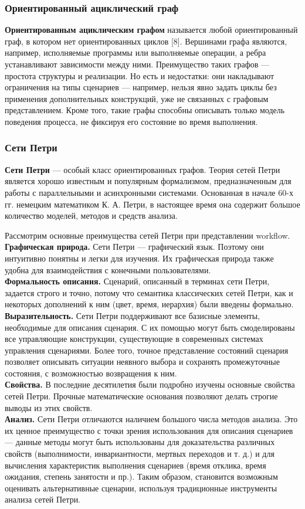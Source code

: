 \documentclass[a4paper,12pt]{article}
\begin{document}
\subsubsection{Ориентированный ациклический граф}
\textbf{Ориентированным ациклическим графом} называется любой ориентированный граф, в котором нет ориентированных циклов [8]. Вершинами графа являются, например, исполняемые программы или выполняемые операции, а ребра устанавливают зависимости между ними.
Преимущество таких графов — простота структуры и реализации. Но есть
и недостатки: они накладывают ограничения на типы сценариев — например, нельзя явно задать циклы без применения дополнительных конструкций, уже не связанных с графовым представлением. Кроме того, такие графы способны описывать только модель поведения процесса, не фиксируя его состояние во время выполнения.


\subsubsection{Сети Петри}
\textbf{Сети Петри}  — особый класс ориентированных графов. Теория сетей Петри является хорошо известным и популярным формализмом, предназначенным для работы с параллельными и асинхронными системами. Основанная в начале 60-х гг. немецким математиком К. А. Петри, в настоящее время она содержит большое количество моделей, методов и средств анализа.

Рассмотрим основные преимущества сетей Петри при представлении
workflow.\\
\textbf{Графическая природа.} Сети Петри — графический язык. Поэтому они
интуитивно понятны и легки для изучения. Их графическая природа
также удобна для взаимодействия с конечными пользователями.\\ \textbf{Формальность описания.} Сценарий, описанный в терминах сети Петри, задается строго и точно, потому что семантика классических сетей Петри,
как и некоторых дополнений к ним (цвет, время, иерархия) были введены
формально.\\
\textbf{Выразительность.} Сети Петри поддерживают все базисные элементы, необходимые для описания сценария. С их помощью могут быть смоделированы все управляющие конструкции, существующие в современных системах управления сценариями. Более того, точное представление состояний
сценария позволяет описывать ситуации неявного выбора и сохранять
промежуточные состояния, с возможностью возвращения к ним.\\
\textbf{Свойства.} В последние десятилетия были подробно изучены основные свойства сетей Петри. Прочные математические основания позволяют делать строгие выводы из этих свойств.\\
\textbf{Анализ.} Сети Петри отличаются наличием большого числа методов анализа. Это их ценное преимущество с точки зрения использования для
описания сценариев — данные методы могут быть использованы для доказательства различных свойств (выполнимости, инвариантности, мертвых переходов и т. д.) и для вычисления характеристик выполнения сценариев (время отклика, время ожидания, степень занятости и пр.). Таким образом, становится возможным оценивать альтернативные сценарии, используя традиционные инструменты анализа сетей Петри.
\end{document}
